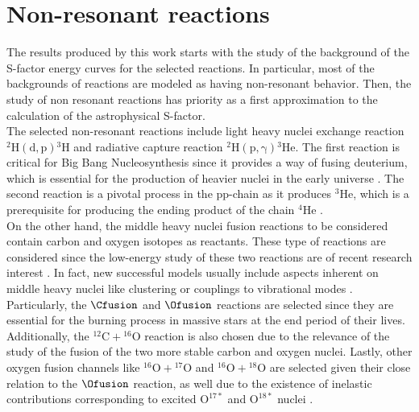 \documentclass[openany]{book}
\begin{document}
\section{Non-resonant reactions} \label{sec:nonResonant}

The  results produced by this work starts with the study of the background of the S-factor energy curves for the selected reactions. In particular, most of the backgrounds of reactions are modeled as having non-resonant behavior. Then, the study of non resonant reactions has priority as a first approximation to the calculation of the astrophysical S-factor. \\

The selected non-resonant reactions include light heavy nuclei exchange reaction $\mathrm{{}^{2}{H}(d,p){}^{3}{H}} $ and radiative capture reaction  $\mathrm{{}^{2}{H} (p, \gamma) {}^{3}{He}} $. The first reaction is critical for Big Bang Nucleosynthesis since it provides a way of fusing deuterium, which is essential for the production of heavier nuclei in the early universe \cite{coc_vangioni_2010}. The second reaction is a pivotal process in the pp-chain as it produces $\mathrm{{}^{3}He}$, which is a prerequisite  for producing the ending product of the chain $\mathrm{{}^{4}He}$ \cite{fowler_1958}. \\

 On the other hand, the middle heavy nuclei fusion reactions to be considered contain carbon and oxygen isotopes as reactants. These type of reactions are considered since the low-energy study of these two reactions are of recent research interest \cite{mukhamedzhanov_pang_kadyrov_2019, taniguchi_kimura_2021, torilov_maltsev_zherebchevsky_2021}. In fact, new successful models usually include aspects inherent on middle heavy nuclei like clustering \cite{assuncao_descouvemont_2016} or couplings to vibrational modes \cite{duarte_gasques_oliveira_zagatto_chamon_medina_added_seale_alcantara-nunez_rossi_et_2015}. \\
 
 Particularly, the $\Cfusion$  and $\Ofusion$ reactions are selected since they are essential for the burning process in massive stars at the end period of their lives. Additionally, the $\mathrm{{}^{12}C + {}^{16}O}$ reaction is also chosen due to the relevance of the study of the fusion of the two more stable carbon and oxygen nuclei. Lastly, other oxygen fusion channels like $\mathrm{{}^{16}O + {}^{17}O}$ and $\mathrm{{}^{16}O + {}^{18}O}$ are selected given their close relation to the $\Ofusion$ reaction, as well due to the existence of inelastic contributions corresponding to excited $\mathrm{O^{17*}}$ and $\mathrm{O^{18*}}$ nuclei \cite{thomas_chen_hinds_meredith_olson_1986}.   \\
\end{document}
